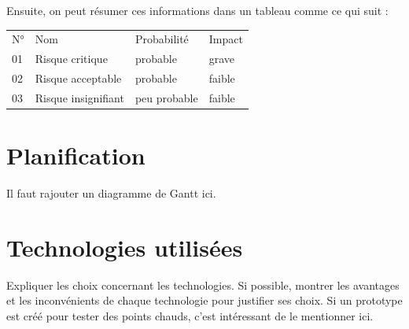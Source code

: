 Ensuite, on peut résumer ces informations dans un tableau comme ce qui suit :

\begin{tabular}{ | l | l | l | l | }
  N° & Nom & Probabilité & Impact \\
  \rowcolor{red!60}
  01 & Risque critique & probable & grave \\
  \rowcolor{red!20}
  02 & Risque acceptable & probable & faible \\
  03 & Risque insignifiant & peu probable & faible
\end{tabular}

\section{Planification}
Il faut rajouter un diagramme de Gantt ici.

\section{Technologies utilisées}
Expliquer les choix concernant les technologies.
Si possible, montrer les avantages et les inconvénients de chaque technologie pour justifier ses choix.
Si un prototype est créé pour tester des points chauds, c'est intéressant de le mentionner ici.
